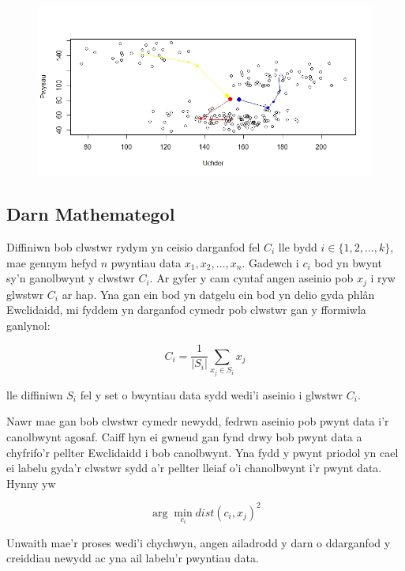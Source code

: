 \begin{enumerate}
\begin{figure}[H]
\begin{center}
\includegraphics[width=0.5\linewidth]{../img/Convergence4.jpeg}
\end{center}
\end{figure}

\end{enumerate}  

\subsection{Darn Mathemategol} %

Diffiniwn bob clwstwr rydym yn ceisio darganfod fel $C_i$ lle bydd $i \in \{ 1, 2, \dots, k\}$, mae gennym hefyd $n$ pwyntiau data $x_1, x_2, \dots, x_n$. Gadewch i $c_i$ bod yn bwynt sy'n ganolbwynt y clwstwr $C_i$. Ar gyfer y cam cyntaf angen aseinio pob $x_j$ i ryw glwstwr $C_i$ ar hap. Yna gan ein bod yn datgelu ein bod yn delio gyda phl\^{a}n Ewclidaidd, mi fyddem yn darganfod cymedr pob clwstwr gan y fformiwla ganlynol:

\begin{equation}
C_i = \frac{1}{|S_i|}\sum_{x_j \in S_i} {x_j}
\end{equation}


lle diffiniwn $S_i$ fel y set o bwyntiau data sydd wedi'i aseinio i glwstwr $C_i$.

Nawr mae gan bob clwstwr cymedr newydd, fedrwn aseinio pob pwynt data i'r canolbwynt agosaf. Caiff hyn ei gwneud gan fynd drwy bob pwynt data a chyfrifo'r pellter Ewclidaidd i bob canolbwynt. Yna fydd y pwynt priodol yn cael ei labelu gyda'r clwstwr sydd a'r pellter lleiaf o'i chanolbwynt i'r pwynt data. Hynny yw

\begin{equation}
\arg \min_{c_i} dist(c_i, x_j)^2
\end{equation}

Unwaith mae'r proses wedi'i chychwyn, angen ailadrodd y darn o ddarganfod y creiddiau newydd ac yna ail labelu'r pwyntiau data.

